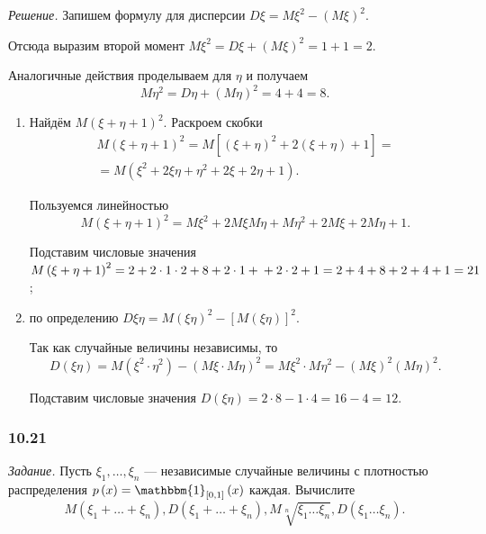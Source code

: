 \textit{Решение.} Запишем формулу для дисперсии $D \xi = M \xi^2 - \left( M \xi \right)^2$.

Отсюда выразим второй момент $M \xi^2 = D \xi + \left( M \xi \right)^2 = 1 + 1 = 2$.

Аналогичные действия проделываем для $ \eta $ и получаем
$$M \eta^2 =
D \eta + \left( M \eta \right)^2 =
4 + 4 =
8.$$

\begin{enumerate}[label=\alph*)]
\item Найдём $M \left( \xi + \eta + 1 \right)^2$.
Раскроем скобки
\begin{equation*}
\begin{split}
M \left( \xi + \eta + 1 \right)^2 =
M \left[ \left( \xi + \eta \right)^2 + 2 \left( \xi + \eta \right) + 1 \right] = \\
= M \left( \xi^2 + 2 \xi \eta + \eta^2 + 2 \xi + 2 \eta + 1 \right).
\end{split}
\end{equation*}

Пользуемся линейностью
$$M \left( \xi + \eta + 1 \right)^2 =
M \xi^2 + 2 M \xi M \eta + M \eta^2 + 2M \xi + 2M \eta + 1.$$

Подставим числовые значения $M \left( \xi + \eta + 1 \right)^2 = 2 + 2 \cdot 1 \cdot 2 + 8 + 2 \cdot 1 + \\
+ 2 \cdot 2 + 1 = 2 + 4 + 8 + 2 + 4 + 1 = 21$;
\item по определению $D \xi \eta = M \left( \xi \eta \right)^2 - \left[ M \left( \xi \eta \right) \right]^2$.

Так как случайные величины независимы, то
$$D \left( \xi \eta \right) =
M \left( \xi^2 \cdot \eta^2 \right) - \left( M \xi \cdot M \eta \right)^2 =
M \xi^2 \cdot M \eta^2 - \left( M \xi \right)^2 \left( M \eta \right)^2.$$

Подставим числовые значения $D \left( \xi \eta \right) = 2 \cdot 8 - 1 \cdot 4 = 16 - 4 = 12$.
\end{enumerate}

\subsubsection*{10.21}

\textit{Задание.}
Пусть $ \xi_1, \dotsc, \xi_n$ ---
независимые случайные величины с плотностью распределения $p \left( x \right) = \mathbbm{1}_{ \left[ 0, 1 \right] } \left( x \right) $ каждая.
Вычислите
$$M \left( \xi_1 + \dotsc + \xi_n \right),
D \left( \xi_1 + \dotsc + \xi_n \right),
M \sqrt[n]{\xi_1 \dotsc \xi_n},
D \left( \xi_1 \dotsc \xi_n \right).$$


